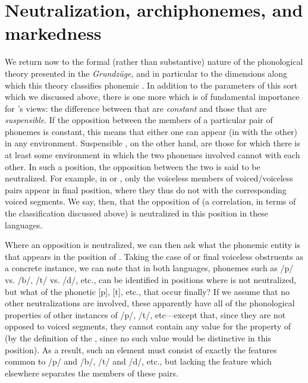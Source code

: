 \section{Neutralization, archiphonemes, and markedness}
\label{sec:neutralization}

We return now to the formal (rather than substantive) nature of the
phonological theory presented in the \textsl{Grundzüge}, and in
particular to the dimensions along which this theory classifies
phonemic . In addition to the parameters of this sort which
we discussed above, there is one more which is of fundamental
importance for {\Trubetzkoy}'s views: the difference between 
that are \emph{constant} and those that are \emph{suspensible}. If the
opposition between the members of a particular pair of phonemes is
constant, this means that either one can appear (in  with the
other) in any environment. Suspensible , on the other hand,
are those for which there is at least some environment in which the
two phonemes involved cannot  with each other. In such a
position, the opposition between the two is said to be
neutralized. For example, in  or , only the voiceless
members of voiced/voiceless pairs appear in final position, where they
thus do not  with the corresponding voiced segments. We say,
then, that the opposition of  (a correlation, in terms of the
classification discussed above) is neutralized in this position in
these languages.

Where an opposition is neutralized, we can then ask what the phonemic
entity is that appears in the position of . Taking the
case of  or  final voiceless obstruents as a concrete
instance, we can note that in both languages, phonemes such as /p/
vs. /b/, /t/ vs. /d/, etc., can be identified in positions where
 is not neutralized, but what of the phonetic [p], [t], etc.,
that occur finally? If we assume that no other neutralizations are
involved, these apparently have all of the phonological properties of
other instances of /p/, /t/, etc—except that, since they are not
opposed to voiced segments, they cannot contain any value for the
property of  (by the definition of the , since no such
value would be distinctive in this position). As a result, such an
element must consist of exactly the features common to /p/ and /b/,
/t/ and /d/, etc., but lacking the feature which elsewhere separates
the members of these pairs.

